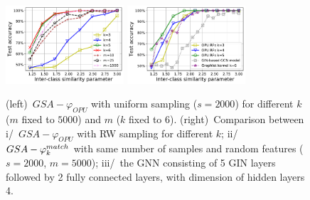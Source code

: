 \documentclass{article}
\newcommand\nt[1]{\textcolor{blue}{#1}}
\begin{document}



\begin{figure}
\centering
	\includegraphics[width=4.4cm]{figs/LightOn_adj_SBM_Similarity_graphlet_size.pdf}%
%
		\includegraphics[width=4.4cm]{figs/LightOn_adj_SBM_similarity_graphlet_size_RW.pdf}%
	\caption{(left)~$GSA-\varphi_{OPU}$ with uniform sampling ($s=2000$) for different $k$ ($m$ fixed to $5000$) and $m$ ($k$ fixed to $6$). (right)~Comparison between i/~$GSA-\varphi_{OPU}$ with RW sampling for different $k$; ii/~$GSA-\varphi^{match}_k$ with same number of samples and random features ($s=2000$, $m=5000$); iii/~the GNN consisting of 5 GIN layers \cite{GCN_powerful} followed by 2 fully connected layers, with dimension of hidden layers 4.
}
	\label{fig:GCN}
\end{figure}
\end{document}
